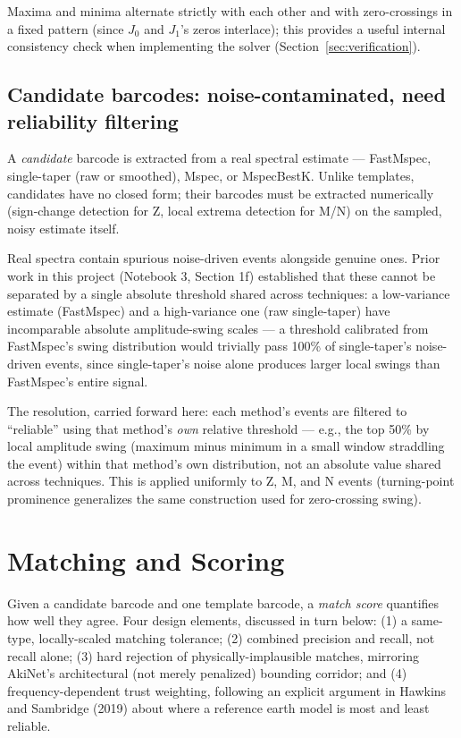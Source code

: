 \documentclass[11pt]{article}
\begin{document}
Maxima and minima alternate strictly with each other and with zero-crossings in a fixed pattern
(since $J_0$ and $J_1$'s zeros interlace); this provides a useful internal consistency check when
implementing the solver (Section~\ref{sec:verification}).

\subsection{Candidate barcodes: noise-contaminated, need reliability filtering}

A \emph{candidate} barcode is extracted from a real spectral estimate --- FastMspec, single-taper
(raw or smoothed), Mspec, or MspecBestK. Unlike templates, candidates have no closed form; their
barcodes must be extracted numerically (sign-change detection for Z, local extrema detection for
M/N) on the sampled, noisy estimate itself.

Real spectra contain spurious noise-driven events alongside genuine ones. Prior work in this
project (Notebook 3, Section 1f) established that these cannot be separated by a single absolute
threshold shared across techniques: a low-variance estimate (FastMspec) and a high-variance one
(raw single-taper) have incomparable absolute amplitude-swing scales --- a threshold calibrated
from FastMspec's swing distribution would trivially pass 100\% of single-taper's noise-driven
events, since single-taper's noise alone produces larger local swings than FastMspec's entire
signal.

The resolution, carried forward here: each method's events are filtered to ``reliable'' using
that method's \emph{own} relative threshold --- e.g., the top 50\% by local amplitude swing
(maximum minus minimum in a small window straddling the event) within that method's own
distribution, not an absolute value shared across techniques. This is applied uniformly to Z, M,
and N events (turning-point prominence generalizes the same construction used for zero-crossing
swing).

\section{Matching and Scoring}
\label{sec:scoring}

Given a candidate barcode and one template barcode, a \emph{match score} quantifies how well they
agree. Four design elements, discussed in turn below: (1) a same-type, locally-scaled matching
tolerance; (2) combined precision and recall, not recall alone; (3) hard rejection of
physically-implausible matches, mirroring AkiNet's architectural (not merely penalized) bounding
corridor; and (4) frequency-dependent trust weighting, following an explicit argument in Hawkins
and Sambridge (2019) about where a reference earth model is most and least reliable.
\end{document}
